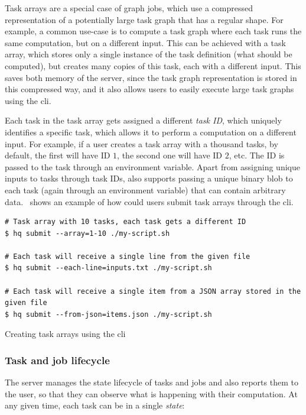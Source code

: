 Task arrays are a special case of graph jobs, which use a compressed representation of a
potentially large task graph that has a regular shape. For example, a common use-case is to compute
a task graph where each task runs the same computation, but on a different input. This can be
achieved with a task array, which stores only a single instance of the task definition (what should
be computed), but creates many copies of this task, each with a different input. This saves both
memory of the server, since the task graph representation is stored in this compressed way, and it
also allows users to easily execute large task graphs using the \gls{cli}.

Each task in the task array gets assigned a different \emph{task ID}, which uniquely
identifies a specific task, which allows it to perform a computation on a different input. For
example, if a user creates a task array with a thousand tasks, by default, the first will have ID
$1$, the second one will have ID $2$, etc. The ID is passed
to the task through an environment variable. Apart from assigning unique inputs to tasks through
task IDs, \hq{} also supports passing a unique binary blob to each task (again
through an environment variable) that can contain arbitrary data.~ shows an
example of how could users submit task arrays through the \gls{cli}.

\begin{listing}[h]
	\begin{verbatim}
# Task array with 10 tasks, each task gets a different ID
$ hq submit --array=1-10 ./my-script.sh

# Each task will receive a single line from the given file
$ hq submit --each-line=inputs.txt ./my-script.sh

# Each task will receive a single item from a JSON array stored in the given file
$ hq submit --from-json=items.json ./my-script.sh
	\end{verbatim}
	\caption{Creating task arrays using the \hyperqueue{} \gls{cli}}
	\label{lst:hq-cli-task-arrays}
\end{listing}

\subsubsection*{Task and job lifecycle}
The server manages the state lifecycle of tasks and jobs and also reports them to the user, so that
they can observe what is happening with their computation. At any given time, each task can be in a
single \emph{state}:

